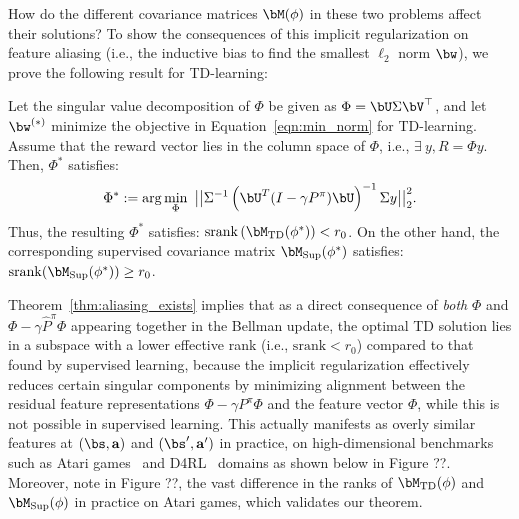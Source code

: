 How do the different covariance matrices $\bM(\phi)$ in these two problems affect their solutions? To show the consequences of this implicit regularization on feature aliasing (i.e., the inductive bias to find the smallest $\ell_2$ norm $\bw$),
we prove the following result for TD-learning:
\begin{theorem}
\label{thm:aliasing_exists}
Let the singular value decomposition of $\Phi$ be given as $\Phi = \bU \Sigma \bV^\top$, and let $\bw^{(*)}$ minimize the objective in Equation~\ref{eqn:min_norm} for TD-learning. Assume that the reward vector lies in the column space of $\Phi$, i.e., $\exists~ y, R = \Phi y $.  Then, $\Phi^*$ satisfies:
\begin{equation*}
    {\Phi^*} := \arg \min_{\Phi}~ \big|\big| \Sigma^{-1} \left( \bU^T (I - \gamma P^\pi) \bU \right)^{-1} \Sigma y\big|\big|_2^2.
\end{equation*}
Thus, the resulting ${\Phi^*}$ satisfies: $\mathrm{srank} \left(\bM_{\mathrm{TD}}(\phi^*)\right) < r_0$. On the other hand, the corresponding supervised covariance matrix $\bM_{\mathrm{Sup}}(\phi^*)$ satisfies: $\mathrm{srank}(\bM_{\mathrm{Sup}}(\phi^*)) \geq r_0$.
\end{theorem}
Theorem~\ref{thm:aliasing_exists} implies that as a direct consequence of \emph{both} $\Phi$ and $\Phi - \gamma \hat{P}^\pi \Phi$ appearing together in the Bellman update, the optimal TD solution lies in a subspace with a lower effective rank (i.e., $\mathrm{srank} < r_0$) compared to that found by supervised learning, because the implicit regularization effectively reduces certain singular components by
minimizing alignment between the residual feature representations $\Phi - \gamma P^\pi \Phi$ and the feature vector $\Phi$, while this is not possible in supervised learning. This actually manifests as overly similar features at $(\bs, \mathbf{a})$ and $(\bs', \mathbf{a}')$
in practice, on high-dimensional benchmarks such as Atari games~\citep{bellemare2013ale} and D4RL~\citep{fu2020d4rl} domains as shown below in Figure ??. Moreover, note in Figure ??, the vast difference in the ranks of $\bM_\mathrm{TD}(\phi)$ and $\bM_\mathrm{Sup}(\phi)$ in practice on Atari games, which validates our theorem.

